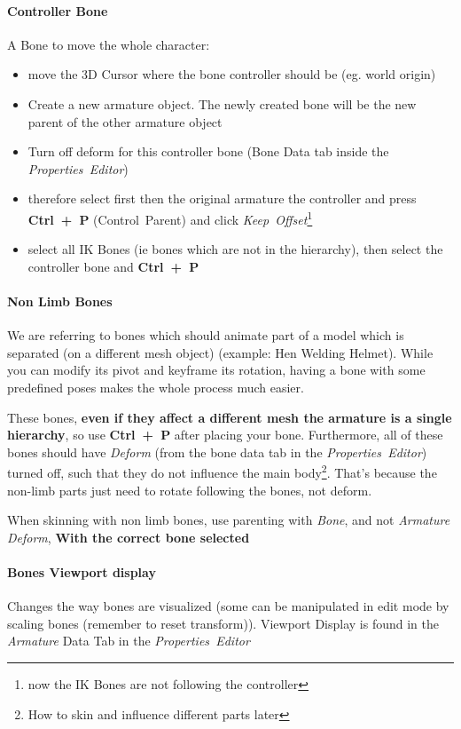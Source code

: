 \documentclass{article}
\begin{document}
\paragraph{Controller Bone}
A Bone to move the whole character:
\begin{itemize}[noitemsep, topsep=0pt]
    \item move the 3D Cursor where the bone controller should be (eg. world origin)
    \item Create a new armature object. The newly created bone will be the new parent of the other armature object
    \item Turn off deform for this controller bone (Bone Data tab inside the \mbox{\textit{Properties Editor}})
    \item therefore select first then the original armature the controller and press \mbox{\textbf{Ctrl + P}} (\mbox{Control Parent}) and click \mbox{\textit{Keep Offset}}\footnote{now the IK Bones are not following the controller}
    \item select all IK Bones (ie bones which are not in the hierarchy), then select the controller bone and \mbox{\textbf{Ctrl + P}}
\end{itemize}

\paragraph{Non Limb Bones}
We are referring to bones which should animate part of a model which is separated (on a different mesh object) (example: Hen Welding Helmet). While you can modify its pivot and keyframe its rotation, 
having a bone with some predefined poses makes the whole process much easier.\par
These bones, \textbf{even if they affect a different mesh the armature is a single hierarchy}, so use \mbox{\textbf{Ctrl + P}} after placing your bone. Furthermore, all of these bones should have 
\textit{Deform} (from the bone data tab in the \mbox{\textit{Properties Editor}}) turned off, such that they do not influence the main body\footnote{How to skin and influence different parts later}. That's
because the non-limb parts just need to rotate following the bones, not deform.\par
When skinning with non limb bones, use parenting with \textit{Bone}, and not \textit{Armature Deform}, \textbf{With the correct bone selected}

\paragraph{Bones Viewport display}
Changes the way bones are visualized (some can be manipulated in edit mode by scaling bones (remember to reset transform)). Viewport Display is found in the \textit{Armature} Data Tab in the
\mbox{\textit{Properties Editor}}
\end{document}
